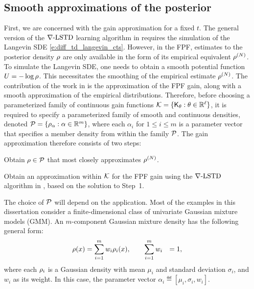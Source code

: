 \subsection{Smooth approximations of the posterior}
\label{s:fpf_em}
First, we are concerned with the gain approximation for a fixed $t$. The general version of the $\nabla\text{-LSTD}$ learning algorithm in  requires the simulation of the Langevin SDE \eqref{e:diff_td_langevin_cts}. However, in the FPF, estimates to the posterior density $\rho$ are only available in the form of its empirical equivalent $\rho^{(N)}$. To simulate the Langevin SDE, one needs to obtain a smooth potential function $U = -\log \rho$. This necessitates the smoothing of the empirical estimate $\rho^{(N)}$. The contribution of the work in \cite{raddevmey16} is the approximation of the FPF gain, along with a smooth approximation of the empirical distributions. Therefore, before choosing a parameterized family of continuous gain functions ${\cal K} = \{\text{\sf K}_\theta : \theta\in\mathbb{R}^{\ell}\}$, it is required to specify a parameterized family  of smooth and continuous densities, denoted  ${\cal P} = \{ \rho_\alpha : \alpha\in\mathbb{R}^m\}$, where each $\alpha_i$ for $1 \leq i \leq m$ is a parameter vector that specifies a member density from within the family ${\cal P}$.
The gain approximation therefore consists of two steps:
\begin{arabnum}
	\item Obtain $\rho\in{\cal P} $ that most closely approximates $\rho^{(N)}$.
	\item  Obtain an approximation within ${\cal K}$ for the FPF gain using the $\nabla\text{-LSTD}$ algorithm in , based on the solution to Step~1.
\end{arabnum}
The choice of ${\cal P}$ will depend on the application. Most of the examples in this dissertation consider a finite-dimensional class of univariate Gaussian mixture models (GMM). An $m$-component Gaussian mixture density has the following general form:
\begin{equation}
\begin{aligned}
\pr(x)& = \sum_{i=1}^{m} w_{i} \pr_{i}(x), \qquad  \sum_{i=1}^{m} w_{i} &=1 ,
\label{e:fpf_gaussian_mix}
\end{aligned}
\end{equation}
\noindent
where each $\rho_{i}$ is a Gaussian density with mean $\mu_{i}$ and standard deviation $\sigma_{i}$, and $w_i$ as its weight. In this case, the parameter vector $\alpha_i \eqdef [ \mu_i, \sigma_i, w_i]$. 
